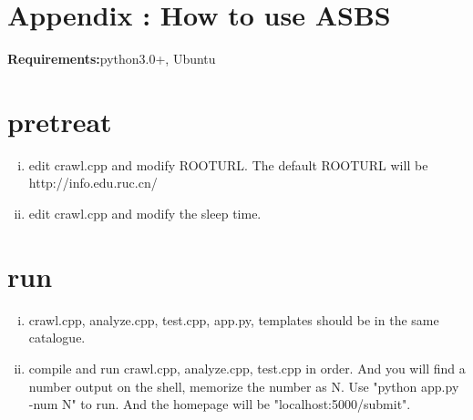 \documentclass[a4paper]{article}
\begin{document}
\section*{Appendix : How to use ASBS}
\appendix
\textbf{Requirements:}python3.0+, Ubuntu
\section{pretreat}
\begin{enumerate}[i)]
\item edit crawl.cpp and modify ROOTURL. The default ROOTURL will be http://info.edu.ruc.cn/
\item edit crawl.cpp and modify the sleep time.
\end{enumerate}
\section{run}
\begin{enumerate}[i)]
\item crawl.cpp, analyze.cpp, test.cpp, app.py, templates should be in the same catalogue.
\item compile and run crawl.cpp, analyze.cpp, test.cpp in order. And you will find a number output on the shell, memorize the number as N. Use "python app.py -num N" to run. And the homepage will be "localhost:5000/submit".
\end{enumerate} 
\end{document}
